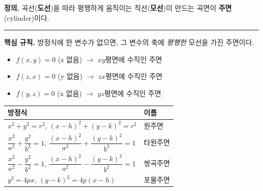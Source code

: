 \documentclass{article}
\theoremstyle{mystyle}
\begin{document}
\begin{tcolorbox}[
    colback=teal!4,
    colframe=teal!65!black,
    title=정의 \& 핵심 규칙,
    fonttitle=\bfseries,
    boxrule=0.5mm,
    arc=3mm
    ]
    \textbf{\textcolor{teal!65!black}{정의.}}\quad
    곡선(\textbf{도선})을 따라 평행하게 움직이는 직선(\textbf{모선})이 만드는 곡면이 \textbf{주면}(cylinder)이다.

    \noindent\textcolor{teal!50!black}{\rule{\linewidth}{0.4pt}}

    \textbf{\textcolor{teal!65!black}{핵심 규칙.}}\quad
    방정식에 한 변수가 없으면, 그 변수의 축에 \emph{평행한} 모선을 가진 주면이다.
    \begin{itemize}
        \item \(f(x,y)=0\) (z 없음) $\to$ \(xy\)평면에 수직인 주면
        \item \(f(z,x)=0\) (y 없음) $\to$ \(zx\)평면에 수직인 주면
        \item \(f(y,z)=0\) (x 없음) $\to$ \(yz\)평면에 수직인 주면
    \end{itemize}
\end{tcolorbox}

\begin{center}
\renewcommand{\arraystretch}{1.4}
\begin{tabular}{|l|l|}
\hline
방정식 & 이름 \\
\hline
\(x^2+y^2=r^2\), \((x-h)^2+(y-k)^2=r^2\) & 원주면 \\
\hline
\(\dfrac{x^2}{a^2}+\dfrac{y^2}{b^2}=1\), \(\dfrac{(x-h)^2}{a^2}+\dfrac{(y-k)^2}{b^2}=1\) & 타원주면 \\
\hline
\(\dfrac{x^2}{a^2}-\dfrac{y^2}{b^2}=1\), \(\dfrac{(x-h)^2}{a^2}-\dfrac{(y-k)^2}{b^2}=1\) & 쌍곡주면 \\
\hline
\(y^2=4px\), \((y-k)^2=4p(x-h)\) & 포물주면 \\
\hline
\end{tabular}
\end{center}
\end{document}
